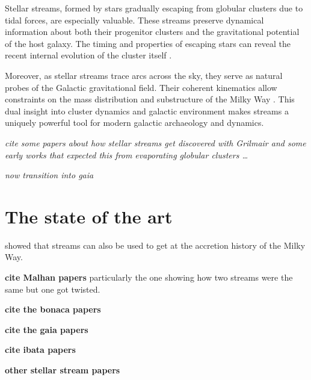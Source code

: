     Stellar streams, formed by stars gradually escaping from globular clusters due to tidal forces, are especially valuable. These streams preserve dynamical information about both their progenitor clusters and the gravitational potential of the host galaxy. The timing and properties of escaping stars can reveal the recent internal evolution of the cluster itself \citep{1972ApJ...178..623T,1995AJ....109.2553G}. 

    Moreover, as stellar streams trace arcs across the sky, they serve as natural probes of the Galactic gravitational field. Their coherent kinematics allow constraints on the mass distribution and substructure of the Milky Way \citep{2011MNRAS.417..198V}. This dual insight into cluster dynamics and galactic environment makes streams a uniquely powerful tool for modern galactic archaeology and dynamics.

    \textit{cite some papers about how stellar streams get discovered with Grilmair and some early works that expected this from evaporating globular clusters \dots}


    \textit{now transition into gaia}

\section{The state of the art}

\citet{2021ApJ...909L..26B} showed that streams can also be used to get at the accretion history of the Milky Way. 

\textbf{cite Malhan papers} particularly the one showing how two streams were the same but one got twisted. 

\textbf{cite the bonaca papers}

\textbf{cite the gaia papers}

\textbf{cite ibata papers}

\textbf{other stellar stream papers}
